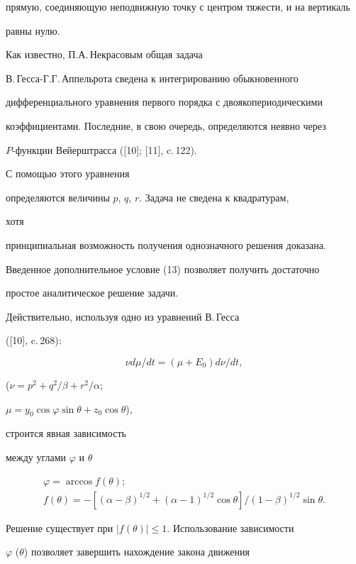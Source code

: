 прямую, соединяющую неподвижную точку с центром тяжести, и на вертикаль


равны нулю.





Как известно, П.А.\,Некрасовым общая задача


В.\,Гесса-Г.Г.\,Аппельрота сведена к интегрированию обыкновенного


дифференциального уравнения первого порядка с двоякопериодическими


коэффициентами. Последние, в свою очередь, определяются неявно через


$P$-функции Вейерштрасса ([10]; [11], c.\,122).


С помощью этого уравнения


определяются величины $p$, $q$, $r$. Задача не сведена к квадратурам,


хотя


принципиальная возможность получения однозначного решения доказана.


Введенное дополнительное условие (13) позволяет получить достаточно


простое аналитическое решение задачи.





Действительно, используя одно из уравнений В.\,Гесса


([10], c.\,268):


$$


\nu d\mu/dt=(\mu+E_0)d\nu/dt,


$$


($\nu=p^2+q^2/\beta+r^2/\alpha$;


$\mu=y_0\cos\varphi\sin\theta+z_0\cos\theta$),


строится явная зависимость


между углами $\varphi$ и $\theta$


\begin{gather*}


\varphi=\arccos f(\theta);\\


f(\theta)=-[(\alpha-\beta)^{1/2}+(\alpha-1)^{1/2}


\cos\theta]/(1-\beta)^{1/2}\sin\theta.


\end{gather*}


Решение существует при $|f(\theta)|\le 1$. Использование зависимости


$\varphi$ ($\theta$) позволяет завершить нахождение закона движения


